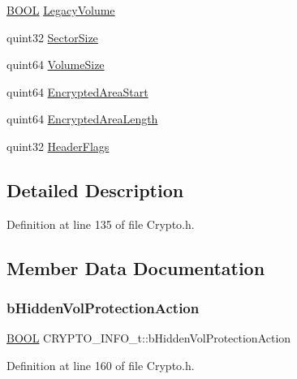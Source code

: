 \begin{DoxyCompactItemize}
\hyperlink{_gstdefs_8h_ae4cc35dcc70810fa972cc8a5185a28fa}{B\+O\+OL} \hyperlink{struct_c_r_y_p_t_o___i_n_f_o__t_a9af407fb5ff31320aac48db51f18441e}{Legacy\+Volume}
\item 
quint32 \hyperlink{struct_c_r_y_p_t_o___i_n_f_o__t_a63222bc15db8c9aa2c14ab609ef7fe8e}{Sector\+Size}
\item 
quint64 \hyperlink{struct_c_r_y_p_t_o___i_n_f_o__t_aa61712c031b298332f74b32a7dd271aa}{Volume\+Size}
\item 
quint64 \hyperlink{struct_c_r_y_p_t_o___i_n_f_o__t_af7a113586dc3cd4d0bd5c14680052e98}{Encrypted\+Area\+Start}
\item 
quint64 \hyperlink{struct_c_r_y_p_t_o___i_n_f_o__t_a60d198b91b9923d142e44376996ab529}{Encrypted\+Area\+Length}
\item 
quint32 \hyperlink{struct_c_r_y_p_t_o___i_n_f_o__t_acccd5ab7a7722ca3a72ee932b8277883}{Header\+Flags}
\end{DoxyCompactItemize}


\subsection{Detailed Description}


Definition at line 135 of file Crypto.\+h.



\subsection{Member Data Documentation}
\mbox{\label{struct_c_r_y_p_t_o___i_n_f_o__t_a2f9295b932eec51180f7f431143d40cf}} 
\subsubsection{\texorpdfstring{b\+Hidden\+Vol\+Protection\+Action}{bHiddenVolProtectionAction}}
{\footnotesize\ttfamily \hyperlink{_gstdefs_8h_ae4cc35dcc70810fa972cc8a5185a28fa}{B\+O\+OL} C\+R\+Y\+P\+T\+O\+\_\+\+I\+N\+F\+O\+\_\+t\+::b\+Hidden\+Vol\+Protection\+Action}



Definition at line 160 of file Crypto.\+h.


